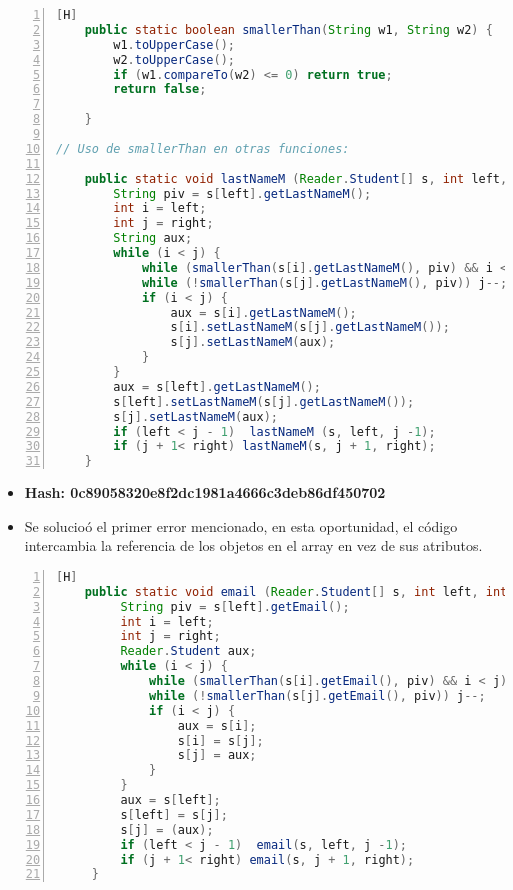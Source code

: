   \begin{lstlisting}[language=Java, caption={Commit: Se mejoró los métodos que ordenan Strings}, numbers=left, firstnumber=1][H]
    public static boolean smallerThan(String w1, String w2) {
        w1.toUpperCase();
        w2.toUpperCase();
        if (w1.compareTo(w2) <= 0) return true;
        return false;
 
    }

// Uso de smallerThan en otras funciones:

    public static void lastNameM (Reader.Student[] s, int left, int right) {
        String piv = s[left].getLastNameM();
        int i = left;
        int j = right;
        String aux;
        while (i < j) {
            while (smallerThan(s[i].getLastNameM(), piv) && i < j) i++;
            while (!smallerThan(s[j].getLastNameM(), piv)) j--;
            if (i < j) {
                aux = s[i].getLastNameM();
                s[i].setLastNameM(s[j].getLastNameM()); 
                s[j].setLastNameM(aux);
            }
        }
        aux = s[left].getLastNameM();
        s[left].setLastNameM(s[j].getLastNameM());
        s[j].setLastNameM(aux);
        if (left < j - 1)  lastNameM (s, left, j -1);
        if (j + 1< right) lastNameM(s, j + 1, right);
    }

  \end{lstlisting}
  \begin{itemize}
    \item \textbf{Hash: 0c89058320e8f2dc1981a4666c3deb86df450702}
    \item Se solucioó el primer error mencionado, en esta oportunidad, el código intercambia la referencia de los objetos en el array en vez de sus atributos.
  \end{itemize}
  \begin{lstlisting}[language=Java, caption={Commit: Se solucionó error de cambio de valores de atributos en vez de las referencias de los objetos}, numbers=left, firstnumber=1][H]
    public static void email (Reader.Student[] s, int left, int right) {
         String piv = s[left].getEmail();
         int i = left;
         int j = right;
         Reader.Student aux;
         while (i < j) {
             while (smallerThan(s[i].getEmail(), piv) && i < j) i++;
             while (!smallerThan(s[j].getEmail(), piv)) j--;
             if (i < j) {
                 aux = s[i];
                 s[i] = s[j]; 
                 s[j] = aux;
             }
         }
         aux = s[left];
         s[left] = s[j];
         s[j] = (aux);
         if (left < j - 1)  email(s, left, j -1);
         if (j + 1< right) email(s, j + 1, right);
     }

  \end{lstlisting}
